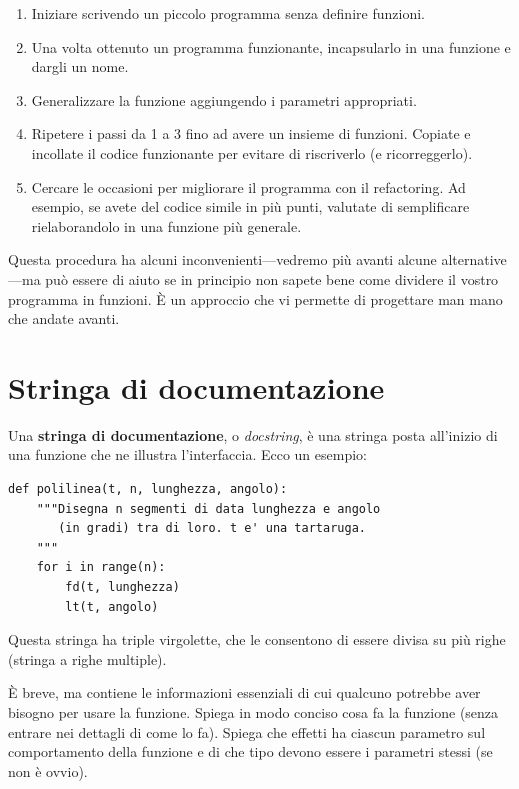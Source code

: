 \documentclass[10pt]{book}
\begin{document}
\begin{enumerate}

\item Iniziare scrivendo un piccolo programma senza definire funzioni.

\item Una volta ottenuto un programma funzionante, incapsularlo in una funzione e dargli un nome.

\item Generalizzare la funzione aggiungendo i parametri appropriati.

\item Ripetere i passi da 1 a 3 fino ad avere un insieme di funzioni. Copiate e incollate il codice funzionante per evitare di riscriverlo (e ricorreggerlo).

\item Cercare le occasioni per migliorare il programma con il refactoring. Ad esempio, se avete del codice simile in più punti, valutate di semplificare rielaborandolo in una funzione più generale.

\end{enumerate}

Questa procedura ha alcuni inconvenienti---vedremo più avanti alcune alternative---ma può essere di aiuto se in principio non sapete bene come dividere il vostro programma in funzioni. È un approccio che vi permette di progettare man mano che andate avanti.


\section{Stringa di documentazione}
\label{docstring}

Una {\bf stringa di documentazione}, o {\em docstring}, è una stringa posta all'inizio di una funzione che ne illustra l'interfaccia. Ecco un esempio:

\begin{verbatim}
def polilinea(t, n, lunghezza, angolo):
    """Disegna n segmenti di data lunghezza e angolo
       (in gradi) tra di loro. t e' una tartaruga.
    """    
    for i in range(n):
        fd(t, lunghezza)
        lt(t, angolo)
\end{verbatim}
%
Questa stringa ha triple virgolette, che le consentono di essere divisa su più righe (stringa a righe multiple).

È breve, ma contiene le informazioni essenziali di cui qualcuno potrebbe aver bisogno per usare la funzione. Spiega in modo conciso cosa fa la funzione (senza entrare nei dettagli di come lo fa). Spiega che effetti ha ciascun parametro sul comportamento della funzione e di che tipo devono essere i parametri stessi (se non è ovvio).
\end{document}
